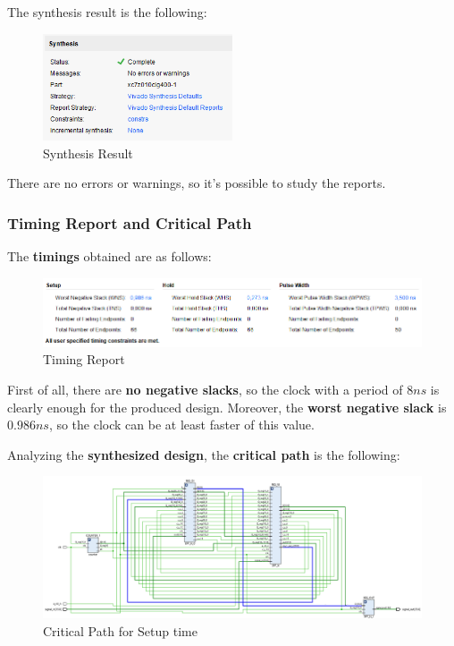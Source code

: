 The synthesis result is the following:

\begin{figure}[H]
    \centering
    \includegraphics[width=0.5\textwidth]{img/Chapter5/SyntesisResult.png}
    \caption{Synthesis Result}
    \label{fig:SR}
\end{figure}

There are no errors or warnings, so it's possible to study the reports.

\subsubsection{Timing Report and Critical Path}

The \textbf{timings} obtained are as follows:

\begin{figure}[H]
    \centering
    \includegraphics[width=1\textwidth]{img/Chapter5/SyntesisTiming.png}
    \caption{Timing Report}
    \label{fig:STR}
\end{figure}

First of all, there are \textbf{no negative slacks}, so the clock with a period of $8ns$ is clearly enough for the produced design. Moreover, the \textbf{worst negative slack} is $0.986ns$, so the clock can be at least faster of this value.

Analyzing the \textbf{synthesized design}, the \textbf{critical path} is the following:

\begin{figure}[H]
    \centering
    \includegraphics[width=1\textwidth]{img/Chapter5/SyntesisSetupCrit.png}
    \caption{Critical Path for Setup time}
    \label{fig:SCPS}
\end{figure}

